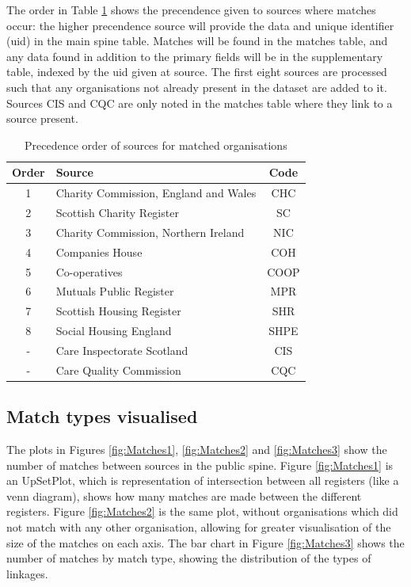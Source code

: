\documentclass{article}
\begin{document}
The  order in Table \ref{tab:order} shows the precendence given to sources where matches occur: the higher precendence
source will provide the data and unique identifier (uid) in the main spine table. Matches will be found in the matches table, and any data
found in addition to the primary fields will be in the supplementary table, indexed by the uid given at source. The first eight sources are processed such that any organisations not already present 
in the dataset are added to it. Sources CIS and CQC are only noted in the matches table where they link to a source present.

\begin{table}[h]
  \centering
  \begin{tabularx}{\textwidth}{|c|X|c|}
    \hline
Order &	Source & Code \\ \hline \hline
1 &	Charity Commission, England and Wales	& CHC	\\ \hline
2 &	Scottish Charity Register	& SC	\\ \hline
3 &	Charity Commission, Northern Ireland	& NIC	\\ \hline
4 &	Companies House 	& COH	\\ \hline
5 &	Co-operatives 	& COOP	\\ \hline
6 &	Mutuals Public Register 	& MPR	\\ \hline
7 &	Scottish Housing Register 	& SHR	\\ \hline
8 &	Social Housing England 	& SHPE	\\ \hline
- &	Care Inspectorate Scotland 	& CIS	\\ \hline
- &	Care Quality Commission 	& CQC	\\ \hline
\hline

\end{tabularx}
\caption{Precedence order of sources for matched organisations}
\label{tab:order}
\end{table}

\clearpage
\subsection{Match types visualised}
\label{sec:match_vis}

The plots in Figures \ref{fig:Matches1}, \ref{fig:Matches2} and \ref{fig:Matches3} 
show the number of matches between sources in the public spine. 
Figure \ref{fig:Matches1} is an UpSetPlot, which is representation of intersection between all registers (like a venn
 diagram), shows how many matches are made
between the different registers. Figure \ref{fig:Matches2} is the same plot, without organisations which did not match 
with any other organisation, allowing for greater visualisation of the size of the matches on each axis. 
The bar chart in Figure \ref{fig:Matches3} shows the number of matches by match type, 
showing the distribution of the types of linkages.
\end{document}
